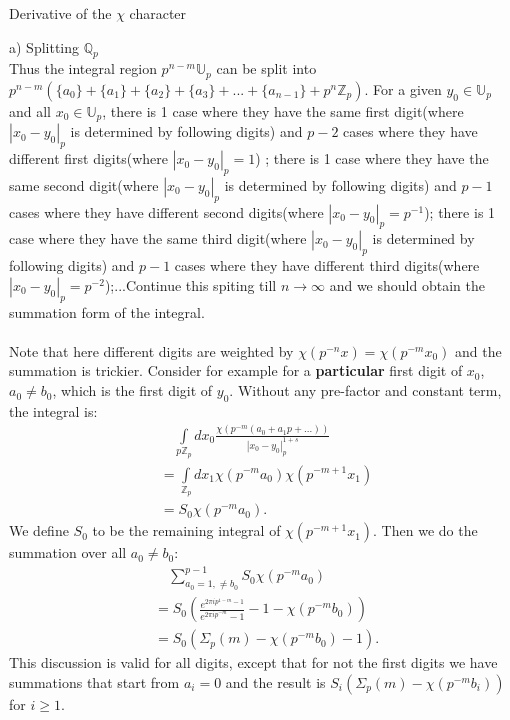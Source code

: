\documentclass[12pt]{article}
\begin{document}
\begin{section}{Derivative of the $\chi$ character}
\begin{paragraph}{a) Splitting $\mathbb{Q}_p$}
\\Thus the integral region $p^{n-m}\mathbb{U}_p$ can be split into $p^{n-m}(\{a_0\}+\{a_1\}+\{a_2\}+\{a_3\}+...+\{a_{n-1}\}+p^n\mathbb{Z}_p)$. For a given $y_0\in\mathbb{U}_p$ and all $x_0\in\mathbb{U}_p$, there is 1 case where they have the same first digit(where $|x_0-y_0|_p$ is determined by following digits) and $p-2$ cases where they have different first digits(where $|x_0-y_0|_p=1$) ; there is 1 case where they have the same second digit(where $|x_0-y_0|_p$ is determined by following digits) and $p-1$ cases where they have different second digits(where $|x_0-y_0|_p=p^{-1}$); there is 1 case where they have the same third digit(where $|x_0-y_0|_p$ is determined by following digits) and $p-1$ cases where they have different third digits(where $|x_0-y_0|_p=p^{-2}$);...Continue this spiting till $n\to\infty$ and we should obtain the summation form of the integral. \\
\\Note that here different digits are weighted by $\chi(p^{-n}x)=\chi(p^{-m}x_0)$ and the summation is trickier. Consider for example for a \textbf{particular} first digit of $x_0$, $a_0\neq b_0$, which is the first digit of $y_0$. Without any pre-factor and constant term, the integral is:
\begin{equation}
\begin{split}
&\quad \int\limits_{p\mathbb{Z}_p}dx_0\frac{\chi(p^{-m}(a_0+a_1 p+...))}{|x_0-y_0|_p^{1+s}} \\
&=\int\limits_{\mathbb{Z}_p}dx_1\chi(p^{-m}a_0)\chi(p^{-m+1}x_1)\\
&=S_0 \chi(p^{-m}a_0).
\end{split}
\end{equation} 
We define $S_0$ to be the remaining integral of $\chi(p^{-m+1}x_1)$. Then we do the summation over all $a_0\neq b_0$:
\begin{equation}
\begin{split}
&\quad \sum\limits^{p-1}_{a_0=1,\neq b_0} S_0 \chi(p^{-m}a_0) \\
&=S_0(\frac{e^{2\pi i p^{1-m}-1}}{e^{2\pi i p^{-m}}-1}-1-\chi(p^{-m}b_0)) \\
&=S_0(\Sigma_p(m)-\chi(p^{-m}b_0)-1).
\end{split}
\end{equation}
This discussion is valid for all digits, except that for not the first digits we have summations that start from $a_i=0$ and the result is $S_i(\Sigma_p(m)-\chi(p^{-m}b_i))$ for $i\geq 1$.\\

\end{paragraph}
\end{section}
\end{document}
